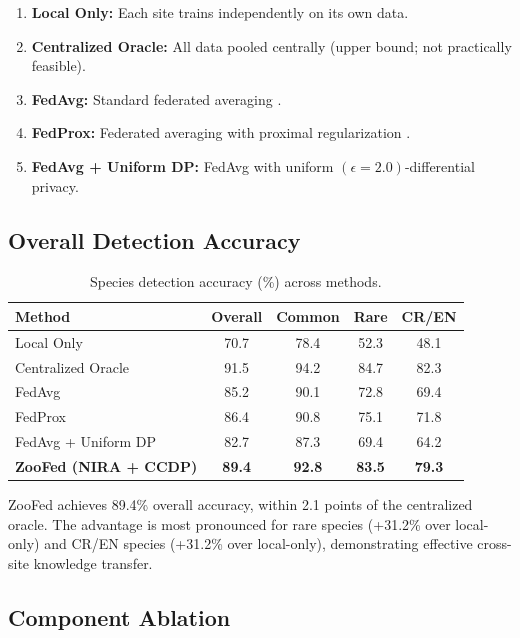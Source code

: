 \begin{enumerate}[leftmargin=*]
    \item \textbf{Local Only:} Each site trains independently on its own data.
    \item \textbf{Centralized Oracle:} All data pooled centrally (upper bound; not practically feasible).
    \item \textbf{FedAvg:} Standard federated averaging \citep{mcmahan2017communication}.
    \item \textbf{FedProx:} Federated averaging with proximal regularization \citep{li2020federated}.
    \item \textbf{FedAvg + Uniform DP:} FedAvg with uniform $(\epsilon=2.0)$-differential privacy.
\end{enumerate}

\subsection{Overall Detection Accuracy}

\begin{table}[H]
\centering
\caption{Species detection accuracy (\%) across methods.}
\label{tab:accuracy}
\begin{tabular}{@{}lcccc@{}}
\toprule
\textbf{Method} & \textbf{Overall} & \textbf{Common} & \textbf{Rare} & \textbf{CR/EN} \\
\midrule
Local Only & 70.7 & 78.4 & 52.3 & 48.1 \\
Centralized Oracle & 91.5 & 94.2 & 84.7 & 82.3 \\
FedAvg & 85.2 & 90.1 & 72.8 & 69.4 \\
FedProx & 86.4 & 90.8 & 75.1 & 71.8 \\
FedAvg + Uniform DP & 82.7 & 87.3 & 69.4 & 64.2 \\
\textbf{ZooFed (NIRA + CCDP)} & \textbf{89.4} & \textbf{92.8} & \textbf{83.5} & \textbf{79.3} \\
\bottomrule
\end{tabular}
\end{table}

ZooFed achieves 89.4\% overall accuracy, within 2.1 points of the centralized oracle.
The advantage is most pronounced for rare species (+31.2\% over local-only) and CR/EN species (+31.2\% over local-only), demonstrating effective cross-site knowledge transfer.

\subsection{Component Ablation}

